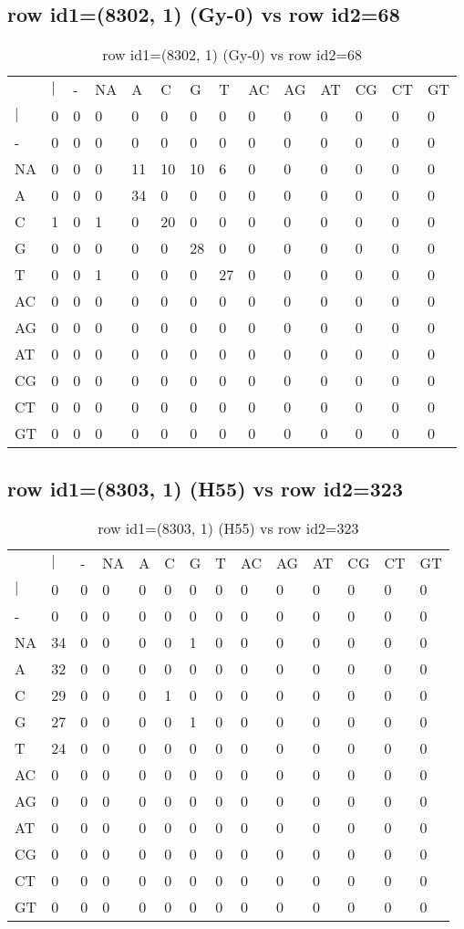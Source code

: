 \subsection{row id1=(8302, 1) (Gy-0) vs row id2=68}
\begin{center}
\begin{longtable}{|l|l|l|l|l|l|l|l|l|l|l|l|l|l|}
\caption{row id1=(8302, 1) (Gy-0) vs row id2=68} \label{table_dm482}\\
\hline
\\
\hline
&$|$&-&NA&A&C&G&T&AC&AG&AT&CG&CT&GT\\
$|$&0&0&0&0&0&0&0&0&0&0&0&0&0\\
-&0&0&0&0&0&0&0&0&0&0&0&0&0\\
NA&0&0&0&11&10&10&6&0&0&0&0&0&0\\
A&0&0&0&34&0&0&0&0&0&0&0&0&0\\
C&1&0&1&0&20&0&0&0&0&0&0&0&0\\
G&0&0&0&0&0&28&0&0&0&0&0&0&0\\
T&0&0&1&0&0&0&27&0&0&0&0&0&0\\
AC&0&0&0&0&0&0&0&0&0&0&0&0&0\\
AG&0&0&0&0&0&0&0&0&0&0&0&0&0\\
AT&0&0&0&0&0&0&0&0&0&0&0&0&0\\
CG&0&0&0&0&0&0&0&0&0&0&0&0&0\\
CT&0&0&0&0&0&0&0&0&0&0&0&0&0\\
GT&0&0&0&0&0&0&0&0&0&0&0&0&0\\
\hline
\end{longtable}
\end{center}

\subsection{row id1=(8303, 1) (H55) vs row id2=323}
\begin{center}
\begin{longtable}{|l|l|l|l|l|l|l|l|l|l|l|l|l|l|}
\caption{row id1=(8303, 1) (H55) vs row id2=323} \label{table_dm484}\\
\hline
\\
\hline
&$|$&-&NA&A&C&G&T&AC&AG&AT&CG&CT&GT\\
$|$&0&0&0&0&0&0&0&0&0&0&0&0&0\\
-&0&0&0&0&0&0&0&0&0&0&0&0&0\\
NA&34&0&0&0&0&1&0&0&0&0&0&0&0\\
A&32&0&0&0&0&0&0&0&0&0&0&0&0\\
C&29&0&0&0&1&0&0&0&0&0&0&0&0\\
G&27&0&0&0&0&1&0&0&0&0&0&0&0\\
T&24&0&0&0&0&0&0&0&0&0&0&0&0\\
AC&0&0&0&0&0&0&0&0&0&0&0&0&0\\
AG&0&0&0&0&0&0&0&0&0&0&0&0&0\\
AT&0&0&0&0&0&0&0&0&0&0&0&0&0\\
CG&0&0&0&0&0&0&0&0&0&0&0&0&0\\
CT&0&0&0&0&0&0&0&0&0&0&0&0&0\\
GT&0&0&0&0&0&0&0&0&0&0&0&0&0\\
\hline
\end{longtable}
\end{center}

